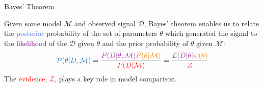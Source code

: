 \documentclass[aspectratio=169, 11pt]{beamer}
\begin{document}
\begin{frame}{Bayes' Theorem}

Given some model $\mathcal{M}$ and observed signal $\mathcal{D}$, Bayes' theorem enables us to relate the \textcolor{RoyalBlue}{posterior} probability of the set of parameters $\theta$ which generated the signal to the \textcolor{Purple}{likelihood} of the $\mathcal{D}$ given $\theta$ and the \textcolor{BurntOrange}{prior} probability of $\theta$ given $\mathcal{M}$:
\vfill
\begin{equation}
    \textcolor{RoyalBlue}{\mathcal{P}(\theta | D, \mathcal{M})} = \frac{\textcolor{Purple}{P(D | \theta, \mathcal{M})} \textcolor{BurntOrange}{P(\theta | \mathcal{M})}}{\textcolor{red}{P(D | \mathcal{M})}} = \frac{\textcolor{Purple}{\mathcal{L}(D | \theta)} \textcolor{BurntOrange}{\pi(\theta)}}{\textcolor{red}{\mathcal{Z}}}
\end{equation}
\vfill
The \textcolor{red}{evidence}, \textcolor{red}{$\mathcal{Z}$}, plays a key role in model comparison.
\end{frame}
\end{document}
